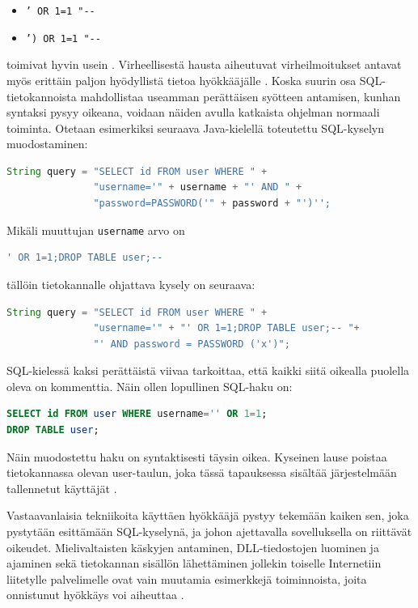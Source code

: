 \begin{itemize}
\item \texttt{' OR 1=1 "{-}{-}}
\item \texttt{') OR 1=1 "{-}{-}}
\end {itemize}
toimivat hyvin usein \cite{WEB2}. Virheellisestä hausta aiheutuvat virheilmoitukset antavat myös erittäin paljon
hyödyllistä tietoa hyökkääjälle \cite{SQLSS}. Koska suurin osa SQL-tietokannoista mahdollistaa useamman perättäisen syötteen 
antamisen, kunhan syntaksi pysyy oikeana, voidaan näiden avulla
katkaista ohjelman normaali toiminta. Otetaan esimerkiksi
seuraava Java-kielellä toteutettu SQL-kyselyn muodostaminen:

\begin{lstlisting}[language=java,aboveskip=0.5cm]
String query = "SELECT id FROM user WHERE " +
               "username='" + username + "' AND " +
               "password=PASSWORD('" + password + "')'';
\end{lstlisting}

\noindent Mikäli muuttujan \texttt{username} arvo on

\begin{lstlisting}[language=sql,aboveskip=0.5cm]
' OR 1=1;DROP TABLE user;-- 
\end{lstlisting}

\noindent tällöin tietokannalle ohjattava kysely on seuraava:

\begin{lstlisting}[language=java,aboveskip=0.5cm]
String query = "SELECT id FROM user WHERE " +
               "username='" + "' OR 1=1;DROP TABLE user;-- "+
               "' AND password = PASSWORD ('x')";
\end{lstlisting}

\noindent SQL-kielessä kaksi perättäistä viivaa tarkoittaa, että kaikki siitä oikealla puolella oleva on kommenttia. 
Näin ollen lopullinen SQL-haku on:

\begin{lstlisting}[language=sql,aboveskip=0.5cm]
SELECT id FROM user WHERE username='' OR 1=1;
DROP TABLE user;
\end{lstlisting}

\noindent Näin muodostettu haku on syntaktisesti täysin oikea. Kyseinen lause
poistaa tietokannassa olevan user-taulun, joka tässä tapauksessa
sisältää järjestelmään tallennetut käyttäjät \cite{WEB2}.

Vastaavanlaisia tekniikoita käyttäen hyökkääjä pystyy tekemään kaiken sen, joka pystytään esittämään SQL-kyselynä, ja johon ajettavalla
sovelluksella on riittävät oikeudet. Mielivaltaisten käskyjen antaminen, DLL-tiedostojen luominen ja ajaminen sekä tietokannan
sisällön lähettäminen jollekin toiselle Internetiin liitetylle palvelimelle ovat vain muutamia esimerkkejä toiminnoista, joita
onnistunut hyökkäys voi aiheuttaa \cite{SQLSS}.


